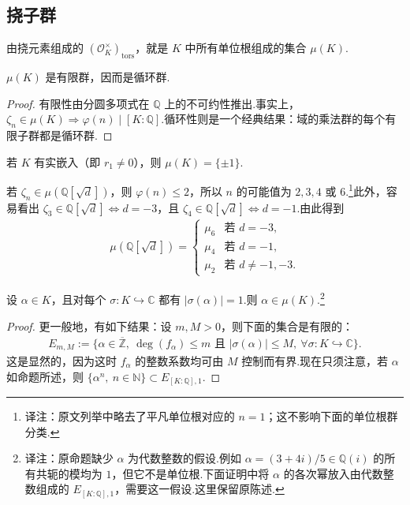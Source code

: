 \subsection{挠子群}\label{sec:nt-5-3-2}
由挠元素组成的 $(\mathcal O_K^\times)_{\mathrm{tors}}$，就是 $K$ 中所有单位根组成的集合 $\mu(K)$.
\begin{lemma*}
$\mu(K)$ 是有限群，因而是循环群.
\end{lemma*}
\begin{proof}
有限性由分圆多项式在 $\mathbb Q$ 上的不可约性推出.事实上，$\zeta_n\in\mu(K)\Rightarrow\varphi(n)\mid[K:\mathbb Q]$.循环性则是一个经典结果：域的乘法群的每个有限子群都是循环群.
\end{proof}
\begin{remark*}
若 $K$ 有实嵌入（即 $r_1\ne0$），则 $\mu(K)=\{\pm1\}$.
\end{remark*}
\begin{example*}[二次域]
若 $\zeta_n\in\mu(\mathbb Q[\sqrt d])$，则 $\varphi(n)\le2$，所以 $n$ 的可能值为 $2,3,4$ 或 $6$.\footnote{译注：原文列举中略去了平凡单位根对应的 $n=1$；这不影响下面的单位根群分类.}此外，容易看出 $\zeta_3\in\mathbb Q[\sqrt d]\Longleftrightarrow d=-3$，且 $\zeta_4\in\mathbb Q[\sqrt d]\Longleftrightarrow d=-1$.由此得到
\begin{align*}
\mu(\mathbb Q[\sqrt d])=
\begin{cases}
\mu_6&\text{若 }d=-3,\\
\mu_4&\text{若 }d=-1,\\
\mu_2&\text{若 }d\ne-1,-3.
\end{cases}
\end{align*}
\end{example*}
\begin{proposition*}\label{prop:nt-5-3-2-modulus-one}
设 $\alpha\in K$，且对每个 $\sigma\colon K\hookrightarrow\mathbb C$ 都有 $|\sigma(\alpha)|=1$.则 $\alpha\in\mu(K)$.\footnote{译注：原命题缺少 $\alpha$ 为代数整数的假设.例如 $\alpha=(3+4i)/5\in\mathbb Q(i)$ 的所有共轭的模均为 $1$，但它不是单位根.下面证明中将 $\alpha$ 的各次幂放入由代数整数组成的 $E_{[K:\mathbb Q],1}$，需要这一假设.这里保留原陈述.}
\end{proposition*}
\begin{proof}
更一般地，有如下结果：设 $m,M>0$，则下面的集合是有限的：
\begin{align*}
E_{m,M}:=\{\alpha\in\overline{\mathbb Z},\ \deg(f_\alpha)\le m\text{ 且 }|\sigma(\alpha)|\le M,\ \forall\sigma\colon K\hookrightarrow\mathbb C\}.
\end{align*}
这是显然的，因为这时 $f_\alpha$ 的整数系数均可由 $M$ 控制而有界.现在只须注意，若 $\alpha$ 如命题所述，则 $\{\alpha^n,\ n\in\mathbb N\}\subset E_{[K:\mathbb Q],1}$.
\end{proof}
